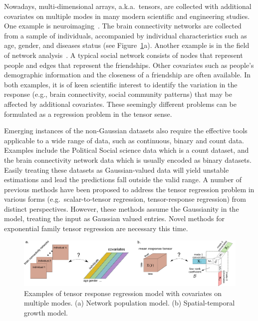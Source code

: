 \documentclass[12pt]{article}
\theoremstyle{plain}
\theoremstyle{definition}
\begin{document}
Nowadays, multi-dimensional arrays, a.k.a.\ tensors, are collected with additional covariates on multiple modes in many modern scientific and engineering studies. One example is neuroimaging~\citep{sun2017store,zhou2013tensor}. The brain connectivity networks are collected from a sample of individuals, accompanied by individual characteristics such as age, gender, and diseases status (see Figure~\ref{fig:intro1}a). Another example is in the field of network analysis~\citep{baldin2018optimal,hoff2005bilinear}. A typical social network consists of nodes that represent people and edges that represent the friendships. Other covariates such as people’s demographic information and the closeness of a friendship are often available. In both examples, it is of keen scientific interest to identify the variation in the response (e.g., brain connectivity, social community patterns) that may be affected by additional covariates. These seemingly different problems can be formulated as a regression problem in the tensor sense. 

Emerging instances of the non-Gaussian datasets also require the effective tools applicable to a wide range of data, such as continuous, binary and count data. Examples include the Political Social science data \citep{hu2015scalable} which is a count dataset, and the brain connectivity network data \citep{wang2019common} which is usually encoded as binary datasets. Easily treating these datasets as Gaussian-valued data will yield unstable estimations and lead the predictions fall outside the valid range. A number of previous methods have been proposed \citep{yu2016learning, llosa2018tensor, raskutti2015convex, zhao2012higher} to address the tensor regression problem in various forms (e.g.\ scalar-to-tensor regression, tensor-response regression) from distinct perspectives. However, these methods assume the Gaussianity in the model, treating the input as Gaussian valued entries. Novel methods for exponential family tensor regression are necessary this time.

\begin{figure}[t]
\begin{center}
\includegraphics[width=16cm]{new_introfigure1.pdf}
\end{center}
\caption{Examples of tensor response regression model with covariates on multiple modes. (a) Network population model. (b) Spatial-temporal growth model. }\label{fig:intro1}
\end{figure}
\end{document}
